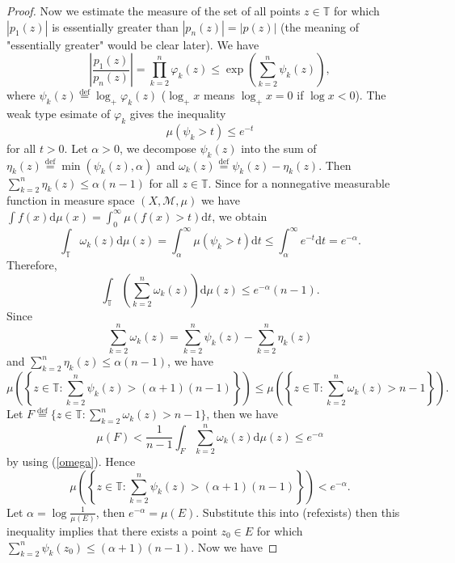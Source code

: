 \begin{proof}
Now we estimate the measure of the set of all points $z\in \mathbb{T}$ for which $\left| p_1(z) \right| $ is essentially greater than $\left| p_n(z) \right| =\left| p(z) \right| $ (the meaning of "essentially greater" would be clear later). We have
\[
  \left| \frac{p_1(z)}{p_n(z)} \right| = \prod_{k=2}^{n}\varphi_k(z)\le \exp\left( \sum_{k=2}^{n}\psi_k(z) \right), 
\] 
where $\psi_k(z) \overset{\mathrm{def}}{=}\log_{+}\varphi_k(z)$ ($\log_{+}x$ means $\log_{+} x=0$ if $\log x <0$). The weak type esimate of $\varphi_k$ gives the inequality 
\[
  \mu \left( \psi_k>t \right)  \le e^{-t}
\] for all $t>0$.
Let $\alpha >0$, we decompose  $\psi_k(z)$ into the sum of $\eta_k(z)\overset{\mathrm{def}}{=}\min\left( \psi_k(z),\alpha \right) $ and $\omega_k(z)\overset{\mathrm{def}}{=}\psi_k(z)-\eta_k(z)$.
Then $\sum_{k=2}^{n}\eta_k(z)\le \alpha(n-1)$ for all $z\in \mathbb{T}$. Since for a nonnegative measurable function in measure space $ \left( X,\mathcal{M},\mu \right) $ we have $\int f(x)\mathrm{d}\mu(x)=\int_0^{\infty}\mu(f(x)>t)\mathrm{d}t$, we obtain 
\[
  \int_{\mathbb{T}}\omega_k(z)\mathrm{d}\mu(z)=\int_{\alpha}^{\infty}\mu(\psi_k>t)\mathrm{d}t\le \int_{\alpha}^{\infty}e^{-t}\mathrm{d}t=e^{-\alpha}.
\] 
Therefore,
\begin{equation}
  \int_{\mathbb{T}}\left( \sum_{k=2}^{n} \omega_k(z) \right) \mathrm{d}\mu(z)\le e^{-\alpha}(n-1)\label{omega}.
\end{equation}
Since 
\[
  \sum_{k=2}^{n} \omega_k(z)=\sum_{k=2}^{n} \psi_k(z)-\sum_{k=2}^{n} \eta_k(z)
\]
and $\sum_{k=2}^{n} \eta_k(z)\le \alpha(n-1)$, we have
\begin{equation*}
    \mu\left( \left\{z\in \mathbb{T}:\sum_{k=2}^{n}\psi_k(z)>(\alpha+1)(n-1)\right\} \right) \le \mu\left( \left\{z\in \mathbb{T}: \sum_{k=2}^{n} \omega_{k}(z)>n-1\right\} \right). 
\end{equation*} 
Let $F\overset{\mathrm{def}}{=} \{z\in \mathbb{T}: \sum_{k=2}^{n} \omega_k(z)>n-1\} $, then we have
\[
  \mu\left( F \right) < \frac{1}{n-1}\int_{F}\sum_{k=2}^{n} \omega_k(z)\mathrm{d}\mu(z)\le e^{-\alpha}
\] 
by using (\ref{omega}). Hence
\begin{equation}
  \mu\left( \left\{z\in \mathbb{T}:\sum_{k=2}^{n} \psi_k(z)>(\alpha+1)(n-1)\right\}  \right) <e^{-\alpha}.\label{exists}
\end{equation}
Let $\alpha = \log \frac{1}{\mu(E)}$, then $e^{-\alpha}=\mu(E)$. Substitute this into (ref{exists}) then this inequality implies that there exists a point $z_0\in E$ for which $\sum_{k=2}^{n} \psi_k(z_0)\le \left( \alpha+1 \right) (n-1)$. Now we have

\end{proof}
